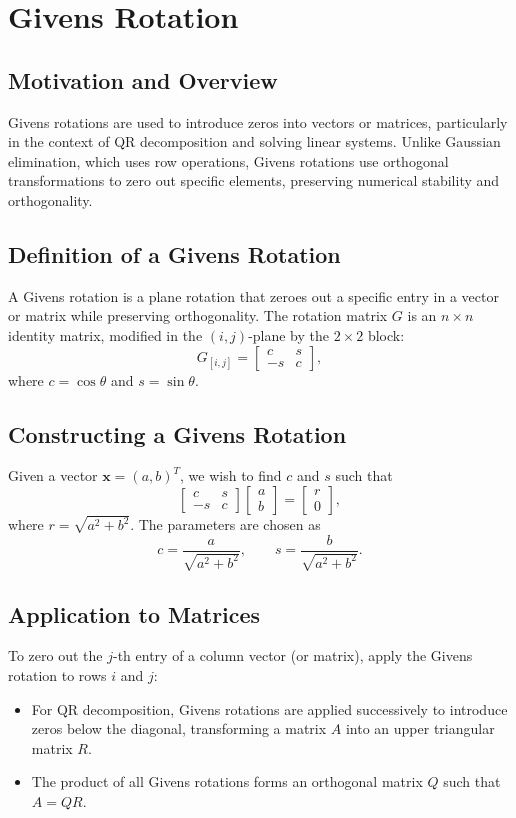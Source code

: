 \section{Givens Rotation}
\label{sec:givens-rotation}

\subsection{Motivation and Overview}
Givens rotations are used to introduce zeros into vectors or matrices, particularly in the context of QR decomposition and solving linear systems. Unlike Gaussian elimination, which uses row operations, Givens rotations use orthogonal transformations to zero out specific elements, preserving numerical stability and orthogonality.

\subsection{Definition of a Givens Rotation}
A Givens rotation is a plane rotation that zeroes out a specific entry in a vector or matrix while preserving orthogonality.
The rotation matrix $G$ is an $n \times n$ identity matrix, modified in the $(i, j)$-plane by the $2 \times 2$ block:
\[
    G_{[i,j]} = \begin{bmatrix}
        c  & s \\
        -s & c
    \end{bmatrix},
\]
where $c = \cos\theta$ and $s = \sin\theta$.

\subsection{Constructing a Givens Rotation}
Given a vector $\mathbf{x} = (a, b)^T$, we wish to find $c$ and $s$ such that
\[
    \begin{bmatrix}
        c  & s \\
        -s & c
    \end{bmatrix}
    \begin{bmatrix}
        a \\
        b
    \end{bmatrix}
    =
    \begin{bmatrix}
        r \\
        0
    \end{bmatrix},
\]
where $r = \sqrt{a^2 + b^2}$. The parameters are chosen as
\[
    c = \frac{a}{\sqrt{a^2 + b^2}}, \qquad s = \frac{b}{\sqrt{a^2 + b^2}}.
\]

\subsection{Application to Matrices}
To zero out the $j$-th entry of a column vector (or matrix), apply the Givens rotation to rows $i$ and $j$:
\begin{itemize}
    \item For QR decomposition, Givens rotations are applied successively to introduce zeros below the diagonal, transforming a matrix $A$ into an upper triangular matrix $R$.
    \item The product of all Givens rotations forms an orthogonal matrix $Q$ such that $A = QR$.
\end{itemize}
